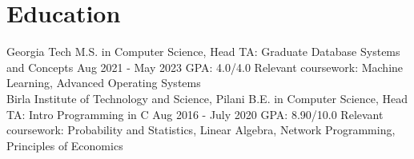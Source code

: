 \vspace{-2.5mm}
\section{Education}

\resumeSubHeadingListStart
\resumeEdu
{Georgia Tech} 
{M.S. in Computer Science, Head TA: Graduate Database Systems and Concepts} 
{Aug 2021 - May 2023}
{GPA: 4.0/4.0}
{Relevant coursework: Machine Learning, Advanced Operating Systems}
\\
\resumeEdu
{Birla Institute of Technology and Science, Pilani} 
{B.E. in Computer Science, Head TA: Intro Programming in C} 
{Aug 2016 - July 2020}
{GPA: 8.90/10.0}
{Relevant coursework: Probability and Statistics, Linear Algebra, Network Programming, Principles of Economics}
\resumeSubHeadingListEnd
\vspace{-3.5mm}
